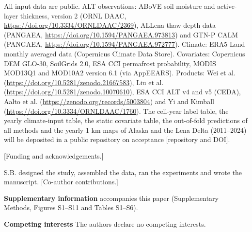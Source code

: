 \ifnum{}
All input data are public. ALT observations: ABoVE soil moisture and active-layer thickness, version 2 (ORNL DAAC, \url{https://doi.org/10.3334/ORNLDAAC/2369}), ALLena thaw-depth data (PANGAEA, \url{https://doi.org/10.1594/PANGAEA.973813}) and GTN-P CALM (PANGAEA, \url{https://doi.org/10.1594/PANGAEA.972777}). Climate: ERA5-Land monthly averaged data (Copernicus Climate Data Store). Covariates: Copernicus DEM GLO-30, SoilGrids 2.0, ESA CCI permafrost probability, MODIS MOD13Q1 and MOD10A2 version 6.1 (via AppEEARS). Products: Wei et al. (\url{https://doi.org/10.5281/zenodo.21667583}), Liu et al. (\url{https://doi.org/10.5281/zenodo.10070610}), ESA CCI ALT v4 and v5 (CEDA), Aalto et al. (\url{https://zenodo.org/records/5003804}) and Yi and Kimball (\url{https://doi.org/10.3334/ORNLDAAC/1760}). The cell-year label table, the yearly climate-input table, the static covariate table, the out-of-fold predictions of all methods and the yearly 1 km maps of Alaska and the Lena Delta (2011--2024) will be deposited in a public repository on acceptance [repository and DOI].
\fi

\ifnum{}
[Funding and acknowledgements.]

S.B. designed the study, assembled the data, ran the experiments and wrote the manuscript. [Co-author contributions.]

\textbf{Supplementary information} accompanies this paper (Supplementary Methods, Figures S1--S11 and Tables S1--S6).

\textbf{Competing interests} The authors declare no competing interests.
\fi
